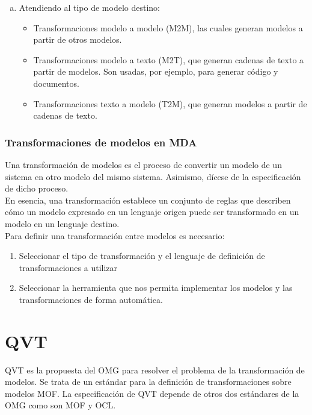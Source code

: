 {\begin{enumerate}[a)]
\begin{itemize}
    \end{itemize}
    \item Atendiendo al tipo de modelo destino:
    \begin{itemize}
    	\item Transformaciones modelo a modelo (M2M), las cuales generan modelos a partir de otros modelos.
    	\item Transformaciones modelo a texto (M2T), que generan cadenas de texto a partir de modelos. Son usadas, por ejemplo, para generar código y documentos.
    	\item Transformaciones texto a modelo (T2M), que generan modelos a partir de cadenas de texto.
    \end{itemize}
\end{enumerate}

\subsubsection*{Transformaciones de modelos en MDA}
\label{Transformaciones de modelos en MDA}

Una transformación de modelos es el proceso de convertir un modelo de un sistema en otro modelo del mismo sistema. Asimismo, dícese de la especificación de dicho proceso.\\

En esencia, una transformación establece un conjunto de reglas que describen cómo un modelo expresado en un lenguaje origen puede ser transformado en un modelo en un lenguaje destino.\\

Para definir una transformación entre modelos es necesario:
\begin{enumerate}[1.]
	\item Seleccionar el tipo de transformación y el lenguaje de definición de transformaciones a utilizar 
	\item Seleccionar la herramienta que nos permita implementar los modelos y las transformaciones de forma automática.	
\end{enumerate}

\section{QVT}
\label{QVT}

QVT es la propuesta del OMG para resolver el problema de la transformación de modelos. Se trata de un estándar para la definición de transformaciones sobre modelos MOF.  La especificación de QVT depende de otros dos estándares de la OMG como son MOF y OCL.\\

}

